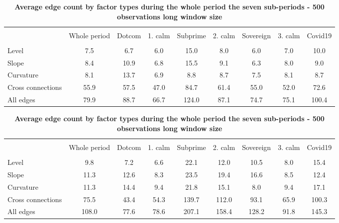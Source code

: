 \documentclass[12pt,bibliography=totoc]{article}
\begin{document}
\begin{table}[H]

\fontsize{10}{10}\selectfont
\centering%
\captionsetup{justification=centering}

\begin{subtable}[t]{1\textwidth}
\centering%
\begin{tabular}{l  cccccccc}%
\hline\hline \\ [-1.5ex]                         %


				& Whole period  &Dotcom	&1. calm  & Subprime & 2. calm &Sovereign & 3. calm & Covid19 \\
\hline \\ [-1.5ex]  
Level				&7.5	&6.7	&6.0		&15.0	&8.0	&6.0		&7.0		&10.0   \\
Slope				&8.4	&10.9	&6.8		&15.5	&9.1	&6.3		&8.0		&9.0    \\
Curvature			&8.1	&13.7	&6.9		&8.8	&8.7	&7.5		&8.1		&8.7    \\
Cross connections	&55.9	&57.5	&47.0		&84.7	&61.4	&55.0		&52.0		&72.6   \\
All edges			&79.9	&88.7	&66.7		&124.0	&87.1	&74.7		&75.1		&100.4	\\


\hline            
\end{tabular}
\caption{\textbf{Average edge count by factor types during the whole period the seven sub-periods - 500 observations long window size}} %
\end{subtable}
\hspace{\fill}

\bigskip 


\begin{subtable}[t]{1\textwidth}
\centering%
\begin{tabular}{l  cccccccc}%
\hline\hline \\ [-1.5ex]                         %


				& Whole period  &Dotcom	&1. calm  & Subprime & 2. calm &Sovereign & 3. calm & Covid19 \\
\hline \\ [-1.5ex]  
Level				&9.8	&7.2	&6.6		&22.1	&12.0	&10.5		&8.0		&15.4   \\
Slope				&11.3	&12.6	&8.3		&23.5	&19.4	&16.6		&8.5		&12.4   \\
Curvature			&11.3	&14.4	&9.4		&21.8	&15.1	&8.0		&9.4		&17.1   \\
Cross connections	&75.5	&43.4	&54.3		&139.7	&112.0	&93.1		&65.9		&100.3  \\
All edges			&108.0	&77.6	&78.6		&207.1	&158.4	&128.2		&91.8		&145.3	\\


\end{tabular}
\end{subtable}
\end{table}
\end{document}
